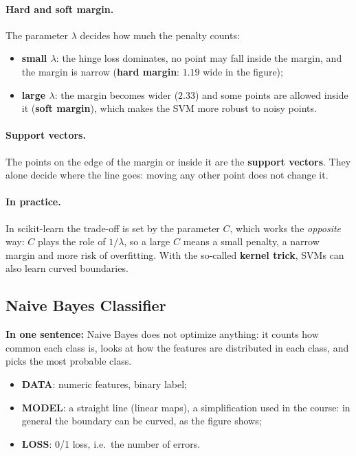 \paragraph{Hard and soft margin.} The parameter $\lambda$ decides how much the penalty counts:
\begin{itemize}
    \item \textbf{small $\lambda$}: the hinge loss dominates, no point may fall inside the margin, and the margin is narrow (\textbf{hard margin}: $1.19$ wide in the figure);
    \item \textbf{large $\lambda$}: the margin becomes wider ($2.33$) and some points are allowed inside it (\textbf{soft margin}), which makes the SVM more robust to noisy points.
\end{itemize}

\paragraph{Support vectors.} The points on the edge of the margin or inside it are the \textbf{support vectors}. They alone decide where the line goes: moving any other point does not change it.

\paragraph{In practice.} In scikit-learn the trade-off is set by the parameter $C$, which works the \emph{opposite} way: $C$ plays the role of $1/\lambda$, so a large $C$ means a small penalty, a narrow margin and more risk of overfitting. With the so-called \textbf{kernel trick}, SVMs can also learn curved boundaries.

\subsection{Naive Bayes Classifier}
\textbf{In one sentence:} Naive Bayes does not optimize anything: it counts how common each class is, looks at how the features are distributed in each class, and picks the most probable class.

\begin{itemize}
    \item \textbf{DATA}: numeric features, binary label;
    \item \textbf{MODEL}: a straight line (linear maps), a simplification used in the course: in general the boundary can be curved, as the figure shows;
    \item \textbf{LOSS}: 0/1 loss, i.e.\ the number of errors.
\end{itemize}

